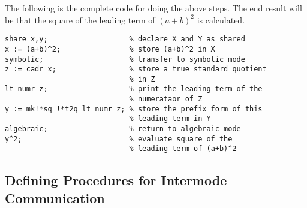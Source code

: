The following is the complete code for doing the above steps. The end
result will be that the square of the leading term of $(a+b)^{2}$ is
calculated.

\begin{verbatim}
share x,y;                   % declare X and Y as shared
x := (a+b)^2;                % store (a+b)^2 in X
symbolic;                    % transfer to symbolic mode
z := cadr x;                 % store a true standard quotient
                             % in Z
lt numr z;                   % print the leading term of the
                             % numerataor of Z
y := mk!*sq !*t2q lt numr z; % store the prefix form of this
                             % leading term in Y
algebraic;                   % return to algebraic mode
y^2;                         % evaluate square of the
                             % leading term of (a+b)^2
\end{verbatim}

\subsection{Defining Procedures for Intermode Communication}

